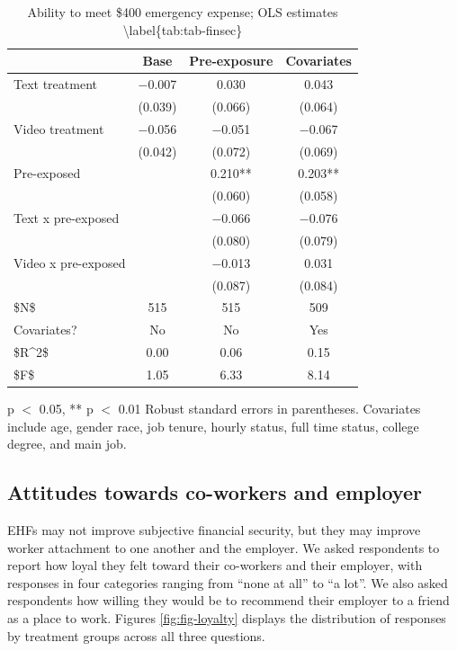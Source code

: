 \documentclass[
  11pt,
  oneside]{article}
\begin{document}
\begin{table}
\centering
\caption{\label{tab:tab-finsec}Ability to meet \$400 emergency expense; OLS estimates \textbackslash{}label\{tab:tab-finsec\}}
\centering
\begin{threeparttable}
\begin{tabular}[t]{lccc}
\toprule
  & Base & Pre-exposure & Covariates\\
\midrule
Text treatment & \num{-0.007} & \num{0.030} & \num{0.043}\\
 & (\num{0.039}) & (\num{0.066}) & (\num{0.064})\\
Video treatment & \num{-0.056} & \num{-0.051} & \num{-0.067}\\
 & (\num{0.042}) & (\num{0.072}) & (\num{0.069})\\
Pre-exposed &  & \num{0.210}** & \num{0.203}**\\
 &  & (\num{0.060}) & (\num{0.058})\\
Text x pre-exposed &  & \num{-0.066} & \num{-0.076}\\
 &  & (\num{0.080}) & (\num{0.079})\\
Video x pre-exposed &  & \num{-0.013} & \num{0.031}\\
 &  & (\num{0.087}) & (\num{0.084})\\
\midrule
\$N\$ & \num{515} & \num{515} & \num{509}\\
Covariates? & No & No & Yes\\
\$R\textasciicircum{}2\$ & \num{0.00} & \num{0.06} & \num{0.15}\\
\$F\$ & \num{1.05} & \num{6.33} & \num{8.14}\\
\bottomrule
\end{tabular}
\begin{tablenotes}
\item * p $<$ 0.05, ** p $<$ 0.01 Robust standard errors in parentheses. Covariates include age, gender race, job tenure, hourly status, full time status, college degree, and main job.
\end{tablenotes}
\end{threeparttable}
\end{table}

\subsection{Attitudes towards co-workers and employer}\label{attitudes-towards-co-workers-and-employer}

EHFs may not improve subjective financial security, but they may improve worker attachment to one another and the employer. We asked respondents to report how loyal they felt toward their co-workers and their employer, with responses in four categories ranging from ``none at all'' to ``a lot''. We also asked respondents how willing they would be to recommend their employer to a friend as a place to work. Figures \ref{fig:fig-loyalty} displays the distribution of responses by treatment groups across all three questions.
\end{document}
